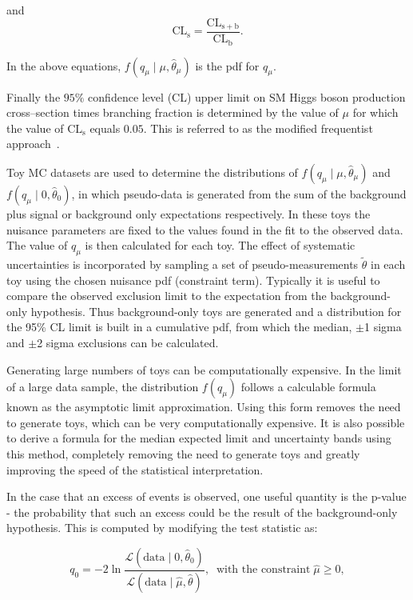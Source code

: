 and 
\begin{equation}
\mathrm{CL_{s}} = \frac{\mathrm{CL_{s+b}}}{\mathrm{CL_{b}}}.
\end{equation}

In the above equations, $f(q_{\mu}\mid\mu,\hat{\theta}_{\mu})$ is the
\ac{pdf} for $q_{\mu}$. 

Finally the $95\%$ confidence level (CL) upper limit on \ac{SM} Higgs boson production
cross--section times branching fraction is determined by the value of $\mu$
for which the value of $\mathrm{CL_{s}}$ equals $0.05$. This is referred to as 
the modified frequentist approach~\cite{Read2}.

Toy \ac{MC} datasets are used to determine the distributions of 
$f(q_{\mu}\mid\mu,\hat{\theta}_{\mu})$ and $f(q_{\mu}\mid0,\hat{\theta}_{0})$,
in which pseudo-data is generated from the sum of the background plus signal or
background only expectations respectively. In these toys the nuisance parameters are
fixed to the values found in the fit to the observed data. The value of
$q_{\mu}$ is then calculated for each toy. The effect of systematic
uncertainties is incorporated by sampling a set of pseudo-measurements
$\tilde{\theta}$ in each toy using the chosen nuisance \ac{pdf} (constraint term).
Typically it is useful to compare the observed exclusion limit to the expectation 
from the background-only hypothesis. Thus background-only toys are generated and
a distribution for the 95\% CL limit is built in a cumulative \ac{pdf}, from
which the median, $\pm$1 sigma and $\pm$2 sigma exclusions can be calculated.

Generating large numbers of toys can be computationally expensive. 
In the limit of a large data sample, the distribution $f(q_{\mu})$ follows a
calculable formula~\cite{Cowan:2011aa} known as the asymptotic limit approximation. Using this form
removes the need to generate toys, which can be very computationally expensive.
It is also possible to derive a formula for
the median expected limit and uncertainty bands using this method, completely
removing the need to generate toys and greatly improving the speed of the
statistical interpretation.

In the case that an excess of events is observed, one useful quantity is the
p-value - the probability that such an excess could be the result of the
background-only hypothesis. This is computed by modifying the test statistic as:

\begin{equation}
q_{0} = -2
\ln\frac{\mathcal{L}(\mathrm{data}\mid0,\hat{\theta}_{0})}{\mathcal{L}(\mathrm{data}\mid\hat{\mu},\hat{\theta})},
\;\; \text{with the constraint} \; \hat{\mu}\geq 0,
\end{equation}

